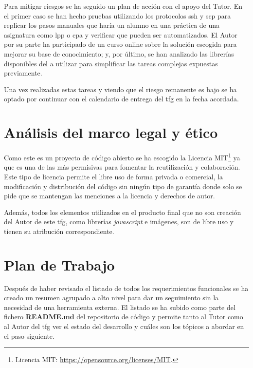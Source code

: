 \documentclass[11pt,spanish,listoffigures,listoftables]{tfgetsinf}
\begin{document}
Para mitigar riesgos se ha seguido un plan de acción con el apoyo del Tutor. En el primer caso se han hecho pruebas utilizando los protocolos \acrshort{ssh} y \acrfull{scp} para replicar los pasos manuales que haría un \gls{alumno} en una práctica de una asignatura como \acrshort{lpp} o \acrshort{cpa} y verificar que pueden ser automatizados. El Autor por su parte ha participado de un curso online \cite{link-coursera-google} sobre la solución  escogida para mejorar su base de conocimiento; y, por último, se han analizado las librerías disponibles del  a utilizar para simplificar las tareas complejas expuestas previamente.

Una vez realizadas estas tareas y viendo que el riesgo remanente es bajo se ha optado por continuar con el calendario de entrega del \acrshort{tfg} en la fecha acordada.

\section{Análisis del marco legal y ético}

Como este es un proyecto de código abierto se ha escogido la Licencia MIT\footnote{Licencia MIT: \url{https://opensource.org/licenses/MIT}.} ya que es una de las más permisivas para fomentar la reutilización y colaboración. Este tipo de licencia permite el libre uso de forma privada o comercial, la modificación y distribución del código sin ningún tipo de garantía donde solo se pide que se mantengan las menciones a la licencia y derechos de autor.

Además, todos los elementos utilizados en el producto final que no son creación del Autor de este \acrshort{tfg}, como librerías \textit{javascript} e imágenes, son de libre uso y tienen su atribución correspondiente.

\section{Plan de Trabajo}

Después de haber revisado el listado de todos los requerimientos funcionales se ha creado un resumen agrupado a alto nivel para dar un seguimiento sin la necesidad de una herramienta externa. El listado se ha subido como parte del fichero \textbf{README.md} del repositorio de código y permite tanto al Tutor como al Autor del \acrshort{tfg} ver el estado del desarrollo y cuáles son los tópicos a abordar en el paso siguiente.
\end{document}
